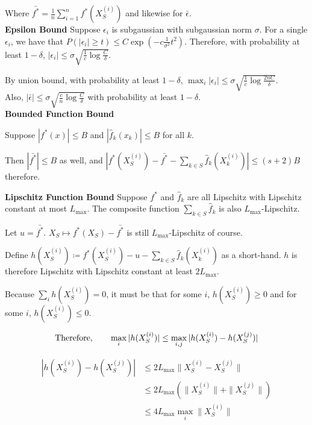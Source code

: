 \documentclass{article}
\begin{document}
Where $\bar{f^*} = \frac{1}{n} \sum_{i=1}^n f^*(X_S^{(i)})$ and likewise for $\bar{\epsilon}$.\\

\textbf{Epsilon Bound}
Suppose $\epsilon_i$ is subgaussian with subgaussian norm $\sigma$. For a single $\epsilon_i$, we have that $P( |\epsilon_i| \geq t ) \leq C \exp( - c \frac{1}{\sigma^2} t^2)$. Therefore, with probability at least $1-\delta$, $|\epsilon_i| \leq \sigma\sqrt{ \frac{1}{c} \log \frac{C}{\delta}}$. 

By union bound, with probability at least $1-\delta$, $\max_i |\epsilon_i| \leq \sigma \sqrt{ \frac{1}{c} \log \frac{2nC}{\delta}}$.\\

Also, $|\bar{\epsilon}| \leq \sigma \sqrt{\frac{c}{n} \log \frac{C}{\delta}}$ with probability at least $1 - \delta$.\\

\textbf{Bounded Function Bound}

Suppose $|f^*(x)| \leq B$ and $|\hat{f}_k(x_k)| \leq B$ for all $k$. 

Then $|\bar{f^*}| \leq B$ as well, and $|f^*(X_S^{(i)}) - \bar{f^*} - \sum_{k \in S} \hat{f}_k(X_k^{(i)})| \leq (s+2) B$ therefore.



\textbf{Lipschitz Function Bound}
Suppose $f^*$ and $\hat{f}_k$ are all Lipschitz with Lipschitz constant at most $L_{\max}$. The composite function $\sum_{k \in S} \hat{f}_k$ is also $L_{\max}$-Lipschitz. 

Let $u = \bar{ f^* }$. $X_S \mapsto f^*(X_S) - \bar{f^*}$ is still $L_{\max}$-Lipschitz of course.

Define $h(X^{(i)}_S) \coloneqq f^*(X^{(i)}_S) -u - \sum_{k \in S} \hat{f}_k(X^{(i)}_k)$ as a short-hand. $h$ is therefore Lipschitz with Lipschitz constant at least $2L_{\max}$.

Because $\sum_i h(X^{(i)}_S) = 0$, it must be that for some $i$, $h(X^{(i)}_S) \geq 0$ and for some $i$, $h(X^{(i)}_S) \leq 0$. 

\[
\textrm{Therefore,}\qquad \max_i |h(X^{(i)}_S)|\leq \max_{i,j} | h(X^{(i)}_S) - h(X^{(j)}_S)|
\]

\begin{align*}
| h(X^{(i)}_S) - h(X^{(j)}_S)|& \leq 2L_{\max} \| X^{(i)}_S - X^{(j)}_S \| \\
&\leq 2L_{\max} (\|X^{(i)}_S\| + \|X^{(j)}_S\|) \\
&\leq 4L_{\max} \max_i \|X^{(i)}_S\|
\end{align*}
\end{document}

